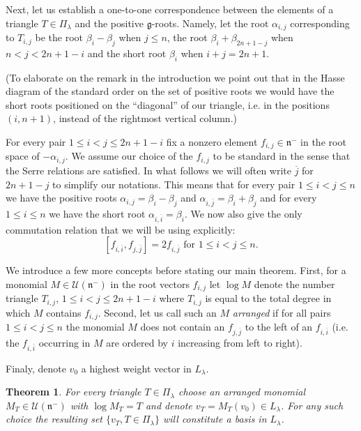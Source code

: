 \documentclass[10pt,a4paper]{article}
\newtheorem{theo}{Theorem}[section]
\theoremstyle{remark}\newtheorem{rema}[theo]{Remark}
\newcommand{\la}{\lambda}
\begin{document}
Next, let us establish a one-to-one correspondence between the elements of a triangle $T\in\Pi_\la$ and the positive $\mathfrak g$-roots. Namely, let the root $\alpha_{i,j}$ corresponding to $T_{i,j}$ be the root $\beta_i-\beta_j$ when $j\le n$, the root $\beta_i+\beta_{2n+1-j}$ when $n<j<2n+1-i$ and the short root $\beta_i$ when $i+j=2n+1$.

(To elaborate on the remark in the introduction we point out that in the Hasse diagram of the standard order on the set of positive roots we would have the short roots positioned on the ``diagonal'' of our triangle, i.e. in the positions $(i,n+1)$, instead of the rightmost vertical column.)

For every pair $1\le i<j\le 2n+1-i$ fix a nonzero element $f_{i,j}\in\mathfrak n^-$ in the root space of $-\alpha_{i,j}$. We assume our choice of the $f_{i,j}$ to be standard in the sense that the Serre relations are satisfied. In what follows we will often write $\overline j$ for $2n+1-j$ to simplify our notations. This means that for every pair $1\le i<j\le n$ we have the positive roots $\alpha_{i,j}=\beta_i-\beta_j$ and $\alpha_{i,\overline j}=\beta_i+\beta_j$ and for every $1\le i\le n$ we have the short root $\alpha_{i,\overline i}=\beta_i$. We now also give the only commutation relation that we will be using explicitly:
\begin{equation}\label{comrel}
[f_{i,\overline i},f_{j,\overline j}]=2f_{i,\overline j}\text{ for }1\le i<j\le n.
\end{equation}

We introduce a few more concepts before stating our main theorem. First, for a monomial $M\in\mathcal U(\mathfrak n^-)$ in the root vectors $f_{i,j}$ let $\log M$ denote the number triangle $T_{i,j}$, $1\le i<j\le 2n+1-i$ where $T_{i,j}$ is equal to the total degree in which $M$ contains $f_{i,j}$. Second, let us call such an $M$ \emph{arranged} if for all pairs $1\le i<j\le n$ the monomial $M$ does not contain an $f_{j,\overline j}$ to the left of an $f_{i,\overline i}$ (i.e. the $f_{i,\overline i}$ occurring in $M$ are ordered by $i$ increasing from left to right).

Finaly, denote $v_0$ a highest weight vector in $L_\la$.

\begin{theo}\label{main}
For every triangle $T\in \Pi_\la$ choose an arranged monomial $M_T\in\mathcal U(\mathfrak n^-)$ with $\log M_T=T$ and denote $v_T=M_T (v_0)\in L_\la$. For any such choice the resulting set $\{v_T, T\in\Pi_\la\}$ will constitute a basis in $L_\la$.
\end{theo}
\end{document}
